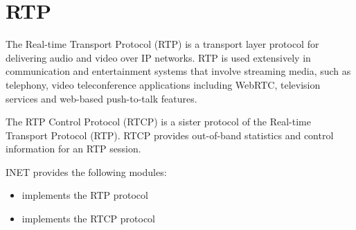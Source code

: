 \section{RTP}
\label{sec:rtp}

The Real-time Transport Protocol (RTP) is a transport layer protocol for
delivering audio and video over IP networks. RTP is used extensively in
communication and entertainment systems that involve streaming media, such as
telephony, video teleconference applications including WebRTC, television
services and web-based push-to-talk features.

The RTP Control Protocol (RTCP) is a sister protocol of the Real-time Transport
Protocol (RTP). RTCP provides out-of-band statistics and control information for
an RTP session.

INET provides the following modules:

\begin{itemize}
  \item {} implements the RTP protocol
  \item {} implements the RTCP protocol
\end{itemize}


